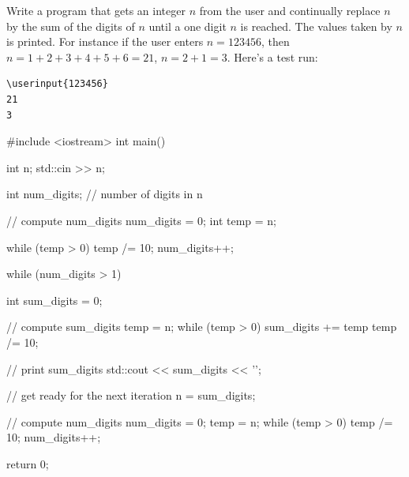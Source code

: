 \nextq
Write a program that gets an integer $n$ from the user and
continually
replace $n$ by the sum of the digits of $n$
until a one digit $n$ is reached.
The values taken by $n$ is printed.
For instance if the user enters $n = 123456$, then
$n = 1+2+3+4+5+6 = 21$,
$n = 2+1 = 3$.
Here's a test run:
\vspace{-5pt}
\begin{Verbatim}[fontsize=\footnotesize,commandchars=\\\{\},frame=single]
\userinput{123456}
21
3
\end{Verbatim}
\ANSWER
\begin{answercode}
#include <iostream>
int main()
{
    int n;
    std::cin >> n;

    int num_digits; // number of digits in n
    
    // compute num_digits
    num_digits = 0;
    int temp = n;
    
    while (temp > 0)
    {
        temp /= 10;
        num_digits++;
    }

    while (num_digits > 1)
    {
        int sum_digits = 0;

        // compute sum_digits
        temp = n;
        while (temp > 0)
        {
            sum_digits += temp %
            temp /= 10;              
        }

        // print sum_digits
        std::cout << sum_digits << '\n';

        // get ready for the next iteration
        n = sum_digits;

        // compute num_digits
        num_digits = 0;
        temp = n;
        while (temp > 0)
        {
            temp /= 10;
            num_digits++;
        }
    }

    return 0;
}
\end{answercode}


